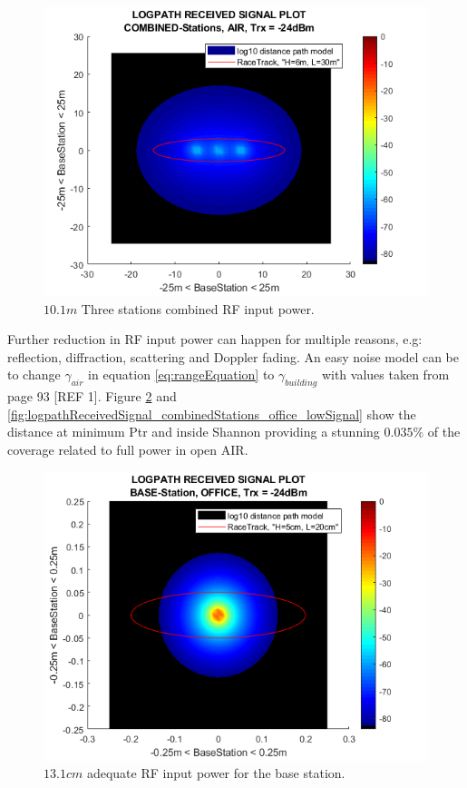 \begin{figure}[h]
	\centering
	\includegraphics[width=\linewidth]{theory/pathLoss/fig/logpathReceivedSignal_combinedStations_air_lowSignal.png}
	\caption{$10.1m$ Three stations combined RF input power.}
	\label{fig:logpathReceivedSignal_combinedStations_air_lowSignal}
\end{figure}

\noindent Further reduction in RF input power can happen for multiple reasons, e.g: reflection, diffraction, scattering and Doppler fading. An easy noise model can be to change $\gamma_{air}$ in equation \ref{eq:rangeEquation} to $\gamma_{building}$ with values taken from page 93 [REF 1]. Figure \ref{fig:logpathReceivedSignal_baseStation_office_lowSignal} and \ref{fig:logpathReceivedSignal_combinedStations_office_lowSignal} show the distance at minimum Ptr and inside Shannon providing a stunning $0.035\%$ of the coverage related to full power in open AIR.
\begin{figure}[h]
	\centering
	\includegraphics[width=\linewidth]{theory/pathLoss/fig/logpathReceivedSignal_baseStation_office_lowSignal.png}
	\caption{$13.1cm$ adequate RF input power for the base station.}
	\label{fig:logpathReceivedSignal_baseStation_office_lowSignal}
\end{figure}

